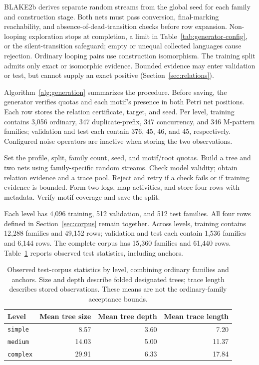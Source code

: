 \documentclass[mathematics,article,submit,moreauthors]{Definitions/mdpi}
\begin{document}
BLAKE2b derives separate random streams from the global seed for each family and construction stage. Both nets must pass conversion, final-marking reachability, and absence-of-dead-transition checks before row expansion. Non-looping exploration stops at completion, a limit in Table~\ref{tab:generator-config}, or the silent-transition safeguard; empty or unequal collected languages cause rejection. Ordinary looping pairs use construction isomorphism. The training split admits only exact or isomorphic evidence. Bounded evidence may enter validation or test, but cannot supply an exact positive (Section~\ref{sec:relations}).

Algorithm~\ref{alg:generation} summarizes the procedure. Before saving, the generator verifies quotas and each motif's presence in both Petri net positions. Each row stores the relation certificate, target, and seed. Per level, training contains 3,056 ordinary, 347 duplicate-prefix, 347 concurrency, and 346 M-pattern families; validation and test each contain 376, 45, 46, and 45, respectively. Configured noise operators are inactive when storing the two observations.

\begin{algorithm}[!tb]
\footnotesize
\caption{Family generation outline}
\label{alg:generation}
\begin{algorithmic}[1]
\State Set the profile, split, family count, seed, and motif/root quotas.
  \State Build a tree and two nets using family-specific random streams.
  \State Check model validity; obtain relation evidence and a trace pool.
  \State Reject and retry if a check fails or if training evidence is bounded.
  \State Form two logs, map activities, and store four rows with metadata.
\EndWhile
\State Verify motif coverage and save the split.
\end{algorithmic}
\end{algorithm}

Each level has 4,096 training, 512 validation, and 512 test families. All four rows defined in Section~\ref{sec:corpus} remain together. Across levels, training contains 12,288 families and 49,152 rows; validation and test each contain 1,536 families and 6,144 rows. The complete corpus has 15,360 families and 61,440 rows. Table~\ref{tab:corpus} reports observed test statistics, including anchors.

\begin{table}[!tb]
\centering
\caption{Observed test-corpus statistics by level, combining ordinary families and anchors. Size and depth describe folded designated trees; trace length describes stored observations. These means are not the ordinary-family acceptance bounds.}
\label{tab:corpus}
\begin{tabular}{@{}lrrr@{}}
\toprule
Level & Mean tree size & Mean tree depth & Mean trace length \\
\midrule
\texttt{simple}  & 8.57 & 3.60 & 7.20 \\
\texttt{medium}  & 14.03 & 5.00 & 11.37 \\
\texttt{complex} & 29.91 & 6.33 & 17.84 \\
\bottomrule
\end{tabular}
\end{table}
\end{document}
